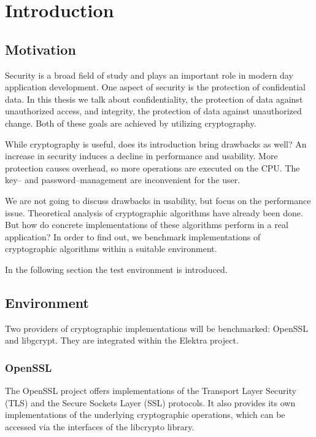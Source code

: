 \chapter{Introduction}

\section{Motivation}

Security is a broad field of study and plays an important role in modern day application development.
One aspect of security is the protection of confidential data.
In this thesis we talk about confidentiality, the protection of data against unauthorized access, and integrity, the protection of data against unauthorized change.
Both of these goals are achieved by utilizing cryptography.

While cryptography is useful, does its introduction bring drawbacks as well?
An increase in security induces a decline in performance and usability.
More protection causes overhead, so more operations are executed on the CPU.
The key-- and password--management are inconvenient for the user.

We are not going to discuss drawbacks in usability, but focus on the performance issue.
Theoretical analysis of cryptographic algorithms have already been done. 
But how do concrete implementations of these algorithms perform in a real application?
In order to find out, we benchmark implementations of cryptographic algorithms within a suitable environment.

In the following section the test environment is introduced.

\section{Environment}

Two providers of cryptographic implementations will be benchmarked: OpenSSL and libgcrypt.
They are integrated within the Elektra project.

	\subsection{OpenSSL}

The OpenSSL project offers implementations of the Transport Layer Security (TLS) and the Secure Sockets Layer (SSL) protocols.
It also provides its own implementations of the underlying cryptographic operations, which can be accessed via the interfaces of the libcrypto library.

